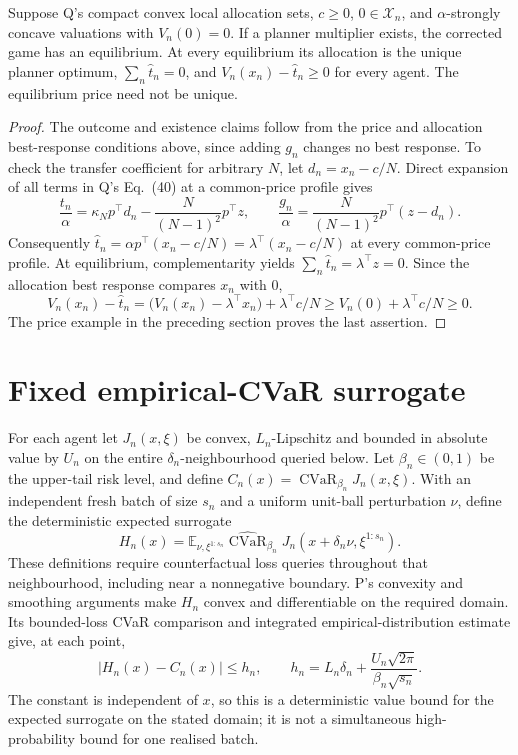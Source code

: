 \documentclass{article}
\begin{document}
\begin{proposition}
Suppose Q's compact convex local allocation sets, \(c\geq0\), \(0\in\mathcal X_n\), and \(\alpha\)-strongly concave valuations with \(V_n(0)=0\). If a planner multiplier exists, the corrected game has an equilibrium. At every equilibrium its allocation is the unique planner optimum, \(\sum_n\widehat t_n=0\), and \(V_n(x_n)-\widehat t_n\geq0\) for every agent. The equilibrium price need not be unique.
\end{proposition} %

\begin{proof}
The outcome and existence claims follow from the price and allocation best-response conditions above, since adding \(g_n\) changes no best response. To check the transfer coefficient for arbitrary \(N\), let \(d_n=x_n-c/N\). Direct expansion of all terms in Q's Eq.~(40) at a common-price profile gives
\[
\frac{t_n}{\alpha}=\kappa_Np^\top d_n-\frac{N}{(N-1)^2}p^\top z,
\qquad
\frac{g_n}{\alpha}=\frac{N}{(N-1)^2}p^\top(z-d_n).
\]
Consequently \(\widehat t_n=\alpha p^\top(x_n-c/N)=\lambda^\top(x_n-c/N)\) at every common-price profile. At equilibrium, complementarity yields \(\sum_n\widehat t_n=\lambda^\top z=0\). Since the allocation best response compares \(x_n\) with \(0\),
\[
V_n(x_n)-\widehat t_n
=\bigl(V_n(x_n)-\lambda^\top x_n\bigr)+\lambda^\top c/N
\geq V_n(0)+\lambda^\top c/N\geq0.
\]
The price example in the preceding section proves the last assertion. %
\end{proof}

\section{Fixed empirical-CVaR surrogate}
For each agent let \(J_n(x,\xi)\) be convex, \(L_n\)-Lipschitz and bounded in absolute value by \(U_n\) on the entire \(\delta_n\)-neighbourhood queried below. Let \(\beta_n\in(0,1)\) be the upper-tail risk level, and define \(C_n(x)=\operatorname{CVaR}_{\beta_n}J_n(x,\xi)\). With an independent fresh batch of size \(s_n\) and a uniform unit-ball perturbation \(\nu\), define the deterministic expected surrogate
\[
H_n(x)=\mathbb E_{\nu,\xi^{1:s_n}}
\widehat{\operatorname{CVaR}}_{\beta_n}
J_n(x+\delta_n\nu,\xi^{1:s_n}).
\]
These definitions require counterfactual loss queries throughout that neighbourhood, including near a nonnegative boundary. P's convexity and smoothing arguments make \(H_n\) convex and differentiable on the required domain. Its bounded-loss CVaR comparison and integrated empirical-distribution estimate give, at each point,
\[
|H_n(x)-C_n(x)|\leq h_n,
\qquad h_n=L_n\delta_n+
\frac{U_n\sqrt{2\pi}}{\beta_n\sqrt{s_n}}.
\]
The constant is independent of \(x\), so this is a deterministic value bound for the expected surrogate on the stated domain; it is not a simultaneous high-probability bound for one realised batch. %
\end{document}
